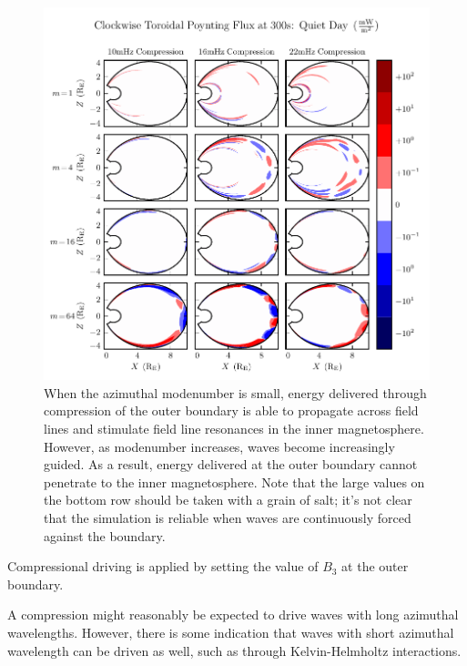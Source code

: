 \begin{figure}[H]
    \centering
    \includegraphics[width=\textwidth]{figures/Stor_B_2.pdf}
    \caption[Decreasing Penetration with Increasing Modenumber]{
      When the azimuthal modenumber is small, energy delivered through compression of the outer boundary is able to propagate across field lines and stimulate field line resonances in the inner magnetosphere. However, as modenumber increases, \Alfven waves become increasingly guided. As a result, energy delivered at the outer boundary cannot penetrate to the inner magnetosphere. Note that the large values on the bottom row should be taken with a grain of salt; it's not clear that the simulation is reliable when waves are continuously forced against the boundary. 
    }
    \label{fig_Stor_B_2}
\end{figure}

Compressional driving is applied by setting the value of $B_3$ at the outer boundary. 

A compression might reasonably be expected to drive waves with long azimuthal wavelengths. However, there is some indication that waves with short azimuthal wavelength can be driven as well, such as through Kelvin-Helmholtz interactions. 


